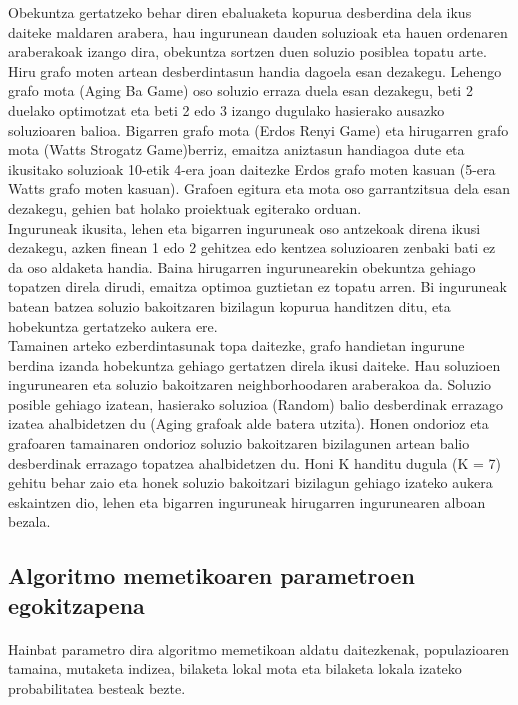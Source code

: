 \documentclass[eu,gi]{ifirak}\usepackage[]{graphicx}\usepackage[]{color}
\begin{document}
Obekuntza gertatzeko behar diren ebaluaketa kopurua desberdina dela ikus daiteke maldaren arabera, hau ingurunean dauden soluzioak eta hauen ordenaren araberakoak izango dira, obekuntza sortzen duen soluzio posiblea topatu arte.\\

Hiru grafo moten artean desberdintasun handia dagoela esan dezakegu. Lehengo grafo mota (Aging Ba Game) oso soluzio erraza duela esan dezakegu, beti 2 duelako optimotzat eta beti 2 edo 3 izango dugulako hasierako ausazko soluzioaren balioa. Bigarren grafo mota (Erdos Renyi Game) eta hirugarren grafo mota (Watts Strogatz Game)berriz, emaitza aniztasun handiagoa dute eta ikusitako soluzioak 10-etik 4-era joan daitezke Erdos grafo moten kasuan (5-era Watts grafo moten kasuan). Grafoen egitura eta mota oso garrantzitsua dela esan dezakegu, gehien bat holako proiektuak egiterako orduan.\\

Inguruneak ikusita, lehen eta bigarren inguruneak oso antzekoak direna ikusi dezakegu, azken finean 1 edo 2 gehitzea edo kentzea soluzioaren zenbaki bati ez da oso aldaketa handia. Baina hirugarren ingurunearekin obekuntza gehiago topatzen direla dirudi, emaitza optimoa guztietan ez topatu arren. Bi inguruneak batean batzea soluzio bakoitzaren bizilagun kopurua handitzen ditu, eta hobekuntza gertatzeko aukera ere.\\

Tamainen arteko ezberdintasunak topa daitezke, grafo handietan ingurune berdina izanda hobekuntza gehiago gertatzen direla ikusi daiteke. Hau soluzioen ingurunearen eta soluzio bakoitzaren neighborhoodaren araberakoa da. Soluzio posible gehiago izatean, hasierako soluzioa (Random) balio desberdinak errazago izatea ahalbidetzen du (Aging grafoak alde batera utzita). Honen ondorioz eta grafoaren tamainaren ondorioz soluzio bakoitzaren bizilagunen artean balio desberdinak errazago topatzea ahalbidetzen du. Honi K handitu dugula (K = 7) gehitu behar zaio  eta honek soluzio bakoitzari bizilagun gehiago izateko aukera eskaintzen dio, lehen eta bigarren inguruneak hirugarren ingurunearen alboan bezala. 

\pagebreak

\subsection{Algoritmo memetikoaren parametroen egokitzapena}
\paragraph{}Hainbat parametro dira algoritmo memetikoan aldatu daitezkenak, populazioaren tamaina, mutaketa indizea, bilaketa lokal mota eta bilaketa lokala izateko probabilitatea besteak bezte.\\
\end{document}
